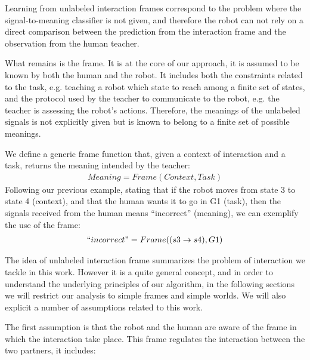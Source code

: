 Learning from unlabeled interaction frames correspond to the problem where the signal-to-meaning classifier is not given, and therefore the robot can not rely on a direct comparison between the prediction from the interaction frame and the observation from the human teacher.

What remains is the frame. It is at the core of our approach, it is assumed to be known by both the human and the robot. It includes both the constraints related to the task, e.g. teaching a robot which state to reach among a finite set of states, and the protocol used by the teacher to communicate to the robot, e.g. the teacher is assessing the robot's actions. Therefore, the meanings of the unlabeled signals is not explicitly given but is known to belong to a finite set of possible meanings.

We define a generic frame function that, given a context of interaction and a task, returns the meaning intended by the teacher:
%
\begin{eqnarray}
Meaning = Frame(Context, Task)
\end{eqnarray}
%
Following our previous example, stating that if the robot moves from state 3 to state 4 (context), and that the human wants it to go in G1 (task), then the signals received from the human means ``incorrect'' (meaning), we can exemplify the use of the frame:
%
\begin{eqnarray}
``incorrect" = Frame((s3 \rightarrow s4), G1)
\end{eqnarray}

\transition

The idea of unlabeled interaction frame summarizes the problem of interaction we tackle in this work. However it is a quite general concept, and in order to understand the underlying principles of our algorithm, in the following sections we will restrict our analysis to simple frames and simple worlds. We will also explicit a number of assumptions related to this work.

The first assumption is that the robot and the human are aware of the frame in which the interaction take place. This frame regulates the interaction between the two partners, it includes:

